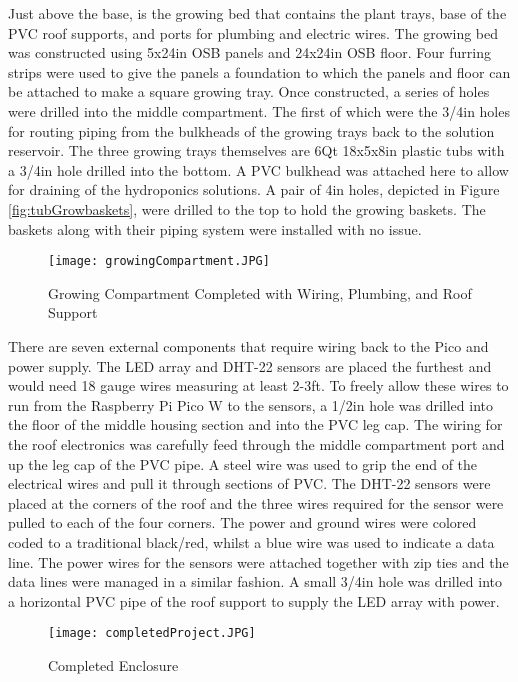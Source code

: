\documentclass[12pt]{article} %
\begin{document}
Just above the base, is the growing bed that contains the plant trays, base of the PVC roof supports, and ports for plumbing and electric wires. The growing bed was constructed using 5x24in OSB panels and 24x24in OSB floor. Four furring strips were used to give the panels a foundation to which the panels and floor can be attached to make a square growing tray. Once constructed, a series of holes were drilled into the middle compartment. The first of which were the 3/4in holes for routing piping from the bulkheads of the growing trays back to the solution reservoir. The three growing trays themselves are 6Qt 18x5x8in plastic tubs with a 3/4in hole drilled into the bottom. A PVC bulkhead was attached here to allow for draining of the hydroponics solutions. A pair of 4in holes, depicted in Figure \ref{fig:tubGrowbaskets}, were drilled to the top to hold the growing baskets. The baskets along with their piping system were installed with no issue. 

\begin{figure}[H]
  \centering
  \texttt{[image: growingCompartment.JPG]}
  \caption{Growing Compartment Completed with Wiring, Plumbing, and Roof Support}
  \label{fig:growingCompartment}
\end{figure}

\pagebreak

There are seven external components that require wiring back to the Pico and power supply. The LED array and DHT-22 sensors are placed the furthest and would need 18 gauge wires measuring at least 2-3ft. To freely allow these wires to run from the Raspberry Pi Pico W to the sensors, a 1/2in hole was drilled into the floor of the middle housing section and into the PVC leg cap. The wiring for the roof electronics was carefully feed through the middle compartment port and up the leg cap of the PVC pipe. A steel wire was used to grip the end of the electrical wires and pull it through sections of PVC. The DHT-22 sensors were placed at the corners of the roof and the three wires required for the sensor were pulled to each of the four corners. The power and ground wires were colored coded to a traditional black/red, whilst a blue wire was used to indicate a data line. The power wires for the sensors were attached together with zip ties and the data lines were managed in a similar fashion. A small 3/4in hole was drilled into a horizontal PVC pipe of the roof support to supply the LED array with power. 

\begin{figure}[H]
  \centering
  \texttt{[image: completedProject.JPG]}
  \caption{Completed Enclosure}
  \label{fig:Completed Project}
\end{figure}
\end{document}
